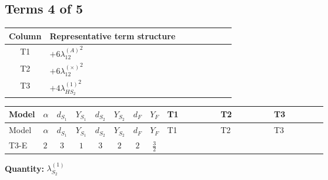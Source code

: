 \documentclass[8pt]{article}
\begin{document}
\begin{landscape}
\subsection*{Terms 4 of 5}
\begin{center}
\begin{tabular}{@{}c >{\raggedright\arraybackslash}p{0.82\linewidth}@{}}
\toprule
Column & Representative term structure \\
\midrule
T1 & \(\displaystyle +6 {\lambda_{12}^{(A)}}^2\) \\
\midrule
T2 & \(\displaystyle +6 {\lambda_{12}^{(\times)}}^2\) \\
\midrule
T3 & \(\displaystyle +4 {\lambda_{HS_2}^{(1)}}^2\) \\
\midrule
\bottomrule
\end{tabular}
\end{center}
\smallskip
\tiny
\begin{longtable}{@{}llcccccc >{\raggedright\arraybackslash}p{0.21\linewidth} >{\raggedright\arraybackslash}p{0.21\linewidth} >{\raggedright\arraybackslash}p{0.21\linewidth}@{}}
\toprule
Model & $\alpha$ & $d_{S_1}$ & $Y_{S_1}$ & $d_{S_2}$ & $Y_{S_2}$ & $d_F$ & $Y_F$ & T1 & T2 & T3 \\
\midrule
\endfirsthead
\toprule
Model & $\alpha$ & $d_{S_1}$ & $Y_{S_1}$ & $d_{S_2}$ & $Y_{S_2}$ & $d_F$ & $Y_F$ & T1 & T2 & T3 \\
\midrule
\endhead
T3-E & $2$ & $3$ & $1$ & $3$ & $2$ & $2$ & $\frac{3}{2}$ & \scriptsize\adjustbox{max width=\linewidth}{$\begin{gathered} +6 {\lambda_{12}^{(A)}}^2\end{gathered}$} & \scriptsize\adjustbox{max width=\linewidth}{$\begin{gathered} +6 {\lambda_{12}^{(\times)}}^2\end{gathered}$} & \scriptsize\adjustbox{max width=\linewidth}{$\begin{gathered} +4 {\lambda_{HS_2}^{(1)}}^2\end{gathered}$} \\
\midrule
\bottomrule
\end{longtable}
\clearpage
\noindent\textbf{Quantity: }$\lambda_{S_2}^{(1)}$\par\smallskip

\end{landscape}
\end{document}
